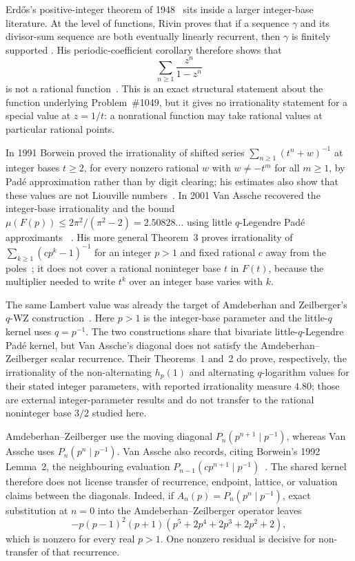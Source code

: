 \documentclass[11pt]{article}
\begin{document}
Erd\H{o}s's positive-integer theorem of
1948~\cite{erdos1948} sits inside a larger integer-base literature.
At the level of functions, Rivin proves that if a sequence \(\gamma\) and its
divisor-sum sequence are both eventually linearly recurrent, then \(\gamma\)
is finitely supported
\cite[Theorem~1.1, p.~2; proof pp.~6--7]{rivin2026}.
His periodic-coefficient corollary therefore shows that
\[
  \sum_{n\ge1}\frac{z^n}{1-z^n}
\]
is not a rational function~\cite[Corollary~6.4, p.~9]{rivin2026}.
This is an exact structural statement about the function underlying
Problem~\#1049, but it gives no irrationality statement for a special value
at \(z=1/t\): a nonrational function may take rational values at particular
rational points.

In 1991
Borwein proved the irrationality of shifted series
$\sum_{n\ge1}(t^{n}+w)^{-1}$ at integer bases $t\ge2$, for every nonzero
rational $w$ with $w\ne-t^m$ for all $m\ge1$, by Pad\'e approximation rather
than by digit clearing; his estimates also show that these values are not
Liouville numbers~\cite[Thm.~4, pp.~257--258]{borwein1991}.  In 2001 Van
Assche recovered the integer-base irrationality and the bound
$\mu(F(p))\le 2\pi^2/(\pi^2-2)=2.50828\ldots$ using little $q$-Legendre
Pad\'e approximants
~\cite[Thm.~1, p.~10; proof pp.~10--11]{vanassche2001}.  His more general
Theorem~3 proves irrationality of
$\sum_{k\ge1}(cp^k-1)^{-1}$ for an integer $p>1$ and fixed rational $c$
away from the poles~\cite[Thm.~3, p.~14]{vanassche2001}; it does not cover a
rational noninteger base $t$ in $F(t)$, because the multiplier needed to
write $t^k$ over an integer base varies with $k$.

The same Lambert value was already the target of Amdeberhan and
Zeilberger's $q$-WZ construction~\cite{az1998}.  Here $p>1$ is the integer-base
parameter and the little-$q$ kernel uses $q=p^{-1}$.  The two constructions
share that bivariate little-$q$-Legendre Pad\'e kernel, but Van Assche's
diagonal does not satisfy the Amdeberhan--Zeilberger scalar recurrence.
Their Theorems~1 and~2 do prove, respectively, the irrationality of the
non-alternating $h_p(1)$ and alternating $q$-logarithm values for their stated
integer parameters, with reported irrationality measure $4.80$; those are
external integer-parameter results and do not transfer to the rational
noninteger base $3/2$ studied here.

Amdeberhan--Zeilberger use the moving diagonal
$P_n(p^{n+1}\mid p^{-1})$, whereas Van Assche uses
$P_n(p^n\mid p^{-1})$.  Van Assche also records, citing
Borwein's 1992 Lemma~2, the neighbouring evaluation
$P_{n-1}(c p^{n+1}\mid p^{-1})$~\cite{borwein1992,vanassche2001}.
The shared kernel therefore does not license transfer of recurrence,
endpoint, lattice, or valuation claims between the diagonals.  Indeed, if
$A_n(p)=P_n(p^n\mid p^{-1})$, exact substitution at $n=0$ into the
Amdeberhan--Zeilberger operator leaves
\[
 -p(p-1)^2(p+1)(p^5+2p^4+2p^3+2p^2+2),
\]
which is nonzero for every real $p>1$.  One nonzero residual is decisive for
non-transfer of that recurrence.
\end{document}
